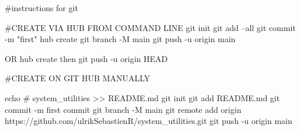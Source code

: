 #instructions for git

#CREATE VIA HUB FROM COMMAND LINE
git init
git add --all
git commit -m "first"
hub create
git branch -M main
git push -u origin main
 
OR hub create then git push -u origin HEAD



#CREATE ON GIT HUB MANUALLY

echo # system_utilities >> README.md
git init
git add README.md
git commit -m first commit
git branch -M main
git remote add origin https://github.com/ulrikSebastienR/system_utilities.git
git push -u origin main
